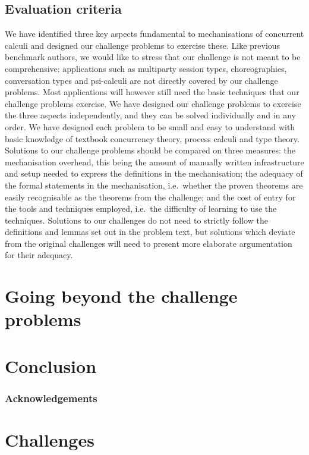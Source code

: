 \documentclass[runningheads]{llncs}
\begin{document}
\subsection{Evaluation criteria}
We have identified three key aspects fundamental to mechanisations of concurrent calculi and designed our challenge problems to exercise these.
Like previous benchmark authors, we would like to stress that our challenge is not meant to be comprehensive: applications such as multiparty session types, choreographies, conversation types and psi-calculi are not directly covered by our challenge problems.
Most applications will however still need the basic techniques that our challenge problems exercise.
We have designed our challenge problems to exercise the three aspects independently, and they can be solved individually and in any order.
We have designed each problem to be small and easy to understand with basic knowledge of textbook concurrency theory, process calculi and type theory.
Solutions to our challenge problems should be compared on three measures: the mechanisation overhead, this being the amount of manually written infrastructure and setup needed to express the definitions in the mechanisation; the adequacy of the formal statements in the mechanisation, i.e.\ whether the proven theorems are easily recognisable as the theorems from the challenge; and the cost of entry for the tools and techniques employed, i.e.\ the difficulty of learning to use the techniques.
Solutions to our challenges do not need to strictly follow the definitions and lemmas set out in the problem text, but solutions which deviate from the original challenges will need to present more elaborate argumentation for their adequacy.


\section{Going beyond the challenge problems}\label{sec:going-beyond}

\section{Conclusion}\label{sec:conclusion}

\subsubsection*{Acknowledgements}

\appendix
\section{Challenges}\label{app:challenges}




\end{document}
